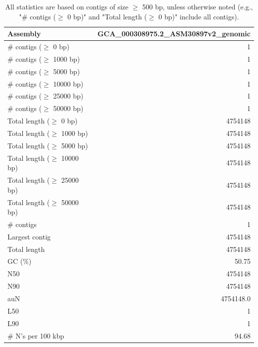\documentclass[12pt,a4paper]{article}
\begin{document}
\begin{table}[ht]
\begin{center}
\caption{All statistics are based on contigs of size $\geq$ 500 bp, unless otherwise noted (e.g., "\# contigs ($\geq$ 0 bp)" and "Total length ($\geq$ 0 bp)" include all contigs).}
\begin{tabular}{|l*{1}{|r}|}
\hline
Assembly & GCA\_000308975.2\_ASM30897v2\_genomic \\ \hline
\# contigs ($\geq$ 0 bp) & 1 \\ \hline
\# contigs ($\geq$ 1000 bp) & 1 \\ \hline
\# contigs ($\geq$ 5000 bp) & 1 \\ \hline
\# contigs ($\geq$ 10000 bp) & 1 \\ \hline
\# contigs ($\geq$ 25000 bp) & 1 \\ \hline
\# contigs ($\geq$ 50000 bp) & 1 \\ \hline
Total length ($\geq$ 0 bp) & 4754148 \\ \hline
Total length ($\geq$ 1000 bp) & 4754148 \\ \hline
Total length ($\geq$ 5000 bp) & 4754148 \\ \hline
Total length ($\geq$ 10000 bp) & 4754148 \\ \hline
Total length ($\geq$ 25000 bp) & 4754148 \\ \hline
Total length ($\geq$ 50000 bp) & 4754148 \\ \hline
\# contigs & 1 \\ \hline
Largest contig & 4754148 \\ \hline
Total length & 4754148 \\ \hline
GC (\%) & 50.75 \\ \hline
N50 & 4754148 \\ \hline
N90 & 4754148 \\ \hline
auN & 4754148.0 \\ \hline
L50 & 1 \\ \hline
L90 & 1 \\ \hline
\# N's per 100 kbp & 94.68 \\ \hline
\end{tabular}
\end{center}
\end{table}
\end{document}
